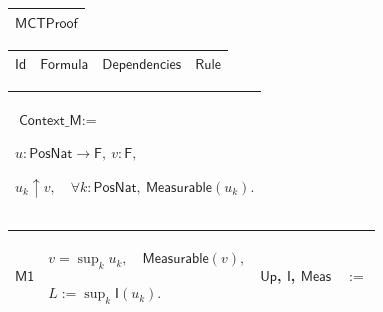 \documentclass[11pt]{amsart}
\renewcommand{\arraystretch}{1.4}
\newlength{\FTCOneColumnBody}
\newlength{\FTCFourColumnBody}
\begin{document}
{\centering
\renewcommand{\arraystretch}{1.4}
\par\setlength{\parskip}{0pt}\nointerlineskip
\noindent
\begin{tabular}{|@{}>{\centering\arraybackslash}m{\FTCOneColumnBody}|}\hline
$\displaystyle \textsf{MCTProof}$\\ \hline
\end{tabular}%
\par\setlength{\parskip}{0pt}\nointerlineskip
\noindent
\begin{tabular}{|@{}>{\centering\arraybackslash}m{0.078431\FTCFourColumnBody}|>{\centering\arraybackslash}m{0.535947\FTCFourColumnBody}|>{\centering\arraybackslash}m{0.281045\FTCFourColumnBody}|>{\centering\arraybackslash}m{0.104575\FTCFourColumnBody}|}\hline
$\displaystyle \textsf{Id}$ & $\displaystyle \textsf{Formula}$ & $\displaystyle \textsf{Dependencies}$ & $\displaystyle \textsf{Rule}$\\ \hline
\end{tabular}%
\par\setlength{\parskip}{0pt}\nointerlineskip
\noindent
\begin{tabular}{|@{}>{\centering\arraybackslash}m{\FTCOneColumnBody}|}\hline
$\displaystyle \textsf{Context\_M}:=$\par
$\displaystyle u:\textsf{PosNat}\to\textsf{F},\ v:\textsf{F},$\par
$\displaystyle u_k\uparrow v,\quad\forall k:\textsf{PosNat},\ \textsf{Measurable}(u_k).$\\ \hline
\end{tabular}%
\par\setlength{\parskip}{0pt}\nointerlineskip
\noindent
\begin{tabular}{|@{}>{\centering\arraybackslash}m{0.078431\FTCFourColumnBody}|>{\centering\arraybackslash}m{0.535947\FTCFourColumnBody}|>{\centering\arraybackslash}m{0.281045\FTCFourColumnBody}|>{\centering\arraybackslash}m{0.104575\FTCFourColumnBody}|}\hline
\hypertarget{proof:M1}{$\displaystyle \textsf{M1}$} & $\displaystyle v=\sup_k u_k,\quad\textsf{Measurable}(v),$\par
$\displaystyle L:=\sup_k\textsf{I}(u_k).$ & \hyperlink{def:Up}{$\displaystyle \textsf{Up}$}, \hyperlink{def:I}{$\displaystyle \textsf{I}$}, \hyperlink{lem:Meas}{$\displaystyle \textsf{Meas}$} & $\displaystyle :=$\\ \hline
\end{tabular}%
\par\setlength{\parskip}{0pt}\nointerlineskip
\noindent
\begin{tabular}{|@{}>{\centering\arraybackslash}m{0.078431\FTCFourColumnBody}|>{\centering\arraybackslash}m{0.535947\FTCFourColumnBody}|>{\centering\arraybackslash}m{0.281045\FTCFourColumnBody}|>{\centering\arraybackslash}m{0.104575\FTCFourColumnBody}|}\hline

\end{tabular}}
\end{document}
